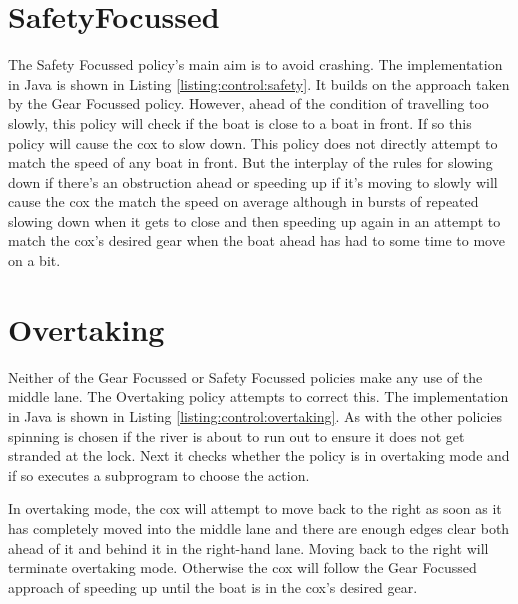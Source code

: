 

\section{SafetyFocussed}

The Safety Focussed policy's main aim is to avoid crashing. The implementation in Java is shown in Listing \ref{listing:control:safety}. It builds on the approach taken by the Gear Focussed policy. However, ahead of the condition of travelling too slowly, this policy will check if the boat is close to a boat in front. If so this policy will cause the cox to slow down. This policy does not directly attempt to match the speed of any boat in front. But the interplay of the rules for slowing down if there's an obstruction ahead or speeding up if it's moving to slowly will cause the cox the match the speed on average although in bursts of repeated slowing down when it gets to close and then speeding up again in an attempt to match the cox's desired gear when the boat ahead has had to some time to move on a bit.



\section{Overtaking}

Neither of the Gear Focussed or Safety Focussed policies make any use of the middle lane. The Overtaking policy  attempts to correct this. The implementation in Java is shown in Listing \ref{listing:control:overtaking}. As with the other policies spinning is chosen if the river is about to run out to ensure it does not get stranded at the lock. Next it checks whether the policy is in overtaking mode and if so executes a subprogram to choose the action.

In overtaking mode, the cox will attempt to move back to the right as soon as it has completely moved into the middle lane and there are enough edges clear both ahead of it and behind it in the right-hand lane. Moving back to the right will terminate overtaking mode. Otherwise the cox will follow the Gear Focussed approach of speeding up until the boat is in the cox's desired gear.

